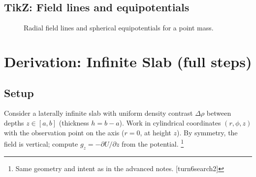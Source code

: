 \documentclass[11pt,a4paper]{article}
\begin{document}
\subsection*{TikZ: Field lines and equipotentials}
\begin{figure}[h]
\centering
{}
\caption{Radial field lines and spherical equipotentials for a point mass.}
\end{figure}

\section{Derivation: Infinite Slab (full steps)}
\subsection{Setup}
Consider a laterally infinite slab with uniform density contrast $\Delta\rho$ between depths $z\in[a,b]$ (thickness $h=b-a$). Work in cylindrical coordinates $(r,\phi,z)$ with the observation point on the axis ($r=0$, at height $z$). By symmetry, the field is vertical; compute $g_z= -\partial U/\partial z$ from the potential.
\footnote{Same geometry and intent as in the advanced notes. [turn6search2]}
\end{document}

